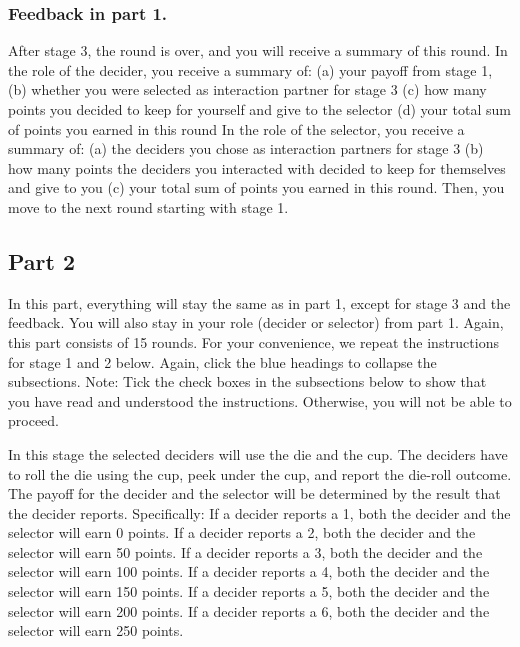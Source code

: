 \documentclass[
  man]{apa6}
\begin{document}
\hypertarget{feedback-in-part-1.}{%
\subsubsection{Feedback in part 1.}\label{feedback-in-part-1.}}

After stage 3, the round is over, and you will receive a summary of this round. In the role of the decider, you receive a summary of: (a) your payoff from stage 1, (b) whether you were selected as interaction partner for stage 3 (c) how many points you decided to keep for yourself and give to the selector (d) your total sum of points you earned in this round In the role of the selector, you receive a summary of: (a) the deciders you chose as interaction partners for stage 3 (b) how many points the deciders you interacted with decided to keep for themselves and give to you (c) your total sum of points you earned in this round. Then, you move to the next round starting with stage 1.

\hypertarget{part-2}{%
\subsection{Part 2}\label{part-2}}

In this part, everything will stay the same as in part 1, except for stage 3 and the feedback. You will also stay in your role (decider or selector) from part 1. Again, this part consists of 15 rounds. For your convenience, we repeat the instructions for stage 1 and 2 below. Again, click the blue headings to collapse the subsections. Note: Tick the check boxes in the subsections below to show that you have read and understood the instructions. Otherwise, you will not be able to proceed.

In this stage the selected deciders will use the die and the cup. The deciders have to roll the die using the cup, peek under the cup, and report the die-roll outcome. The payoff for the decider and the selector will be determined by the result that the decider reports. Specifically: If a decider reports a 1, both the decider and the selector will earn 0 points. If a decider reports a 2, both the decider and the selector will earn 50 points. If a decider reports a 3, both the decider and the selector will earn 100 points. If a decider reports a 4, both the decider and the selector will earn 150 points. If a decider reports a 5, both the decider and the selector will earn 200 points. If a decider reports a 6, both the decider and the selector will earn 250 points.
\end{document}
